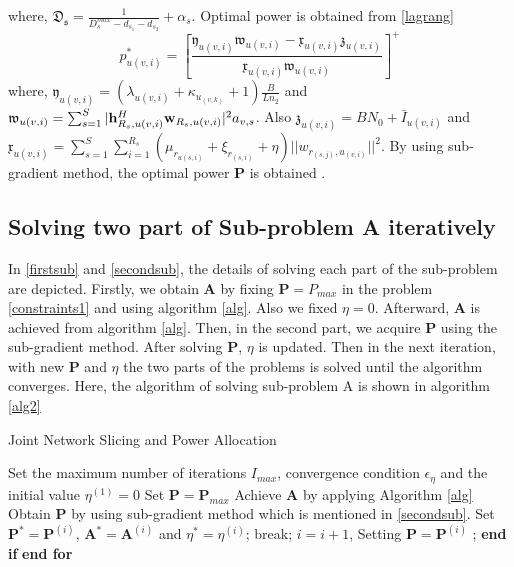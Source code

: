 \documentclass[conference]{IEEEtran}
\begin{document}
where, $\mathfrak{D_s}=\frac{1}{D_{s}^{max}-d_{s_1}-d_{s_2}}+\alpha_s$. Optimal power is obtained from  \eqref{lagrang}
\begin{equation}
p_{u(v,i)}^{*} = [\frac{\mathfrak{y}_{u(v,i)}\mathfrak{w}_{u(v,i)}-\mathfrak{x}_{u(v,i)}\mathfrak{z}_{u(v,i)}}{\mathfrak{x}_{u(v,i)}\mathfrak{w}_{u(v,i)} }]^+
\end{equation}
where, $\mathfrak{y}_{u(v,i)}= (\lambda_{u(v,i)}+\kappa_{u_{(v,k)}}+1)\frac{B}{Ln_2}$ and
$\mathfrak{w}_{u(v,i)} = \sum_{s=1}^{S}|\bold{h}_{R_s,u(v,i)}^H \bold{w}_{R_s,u(v,i)}|^2 a_{v,s}$. Also
$\mathfrak{z}_{u(v,i)} = BN_0 + \bar{I}_{u(v,i)}$ and $\mathfrak{x}_{u(v,i)} = \sum\limits_{s=1}^{S} \sum\limits_{i=1}^{R_s} ( \mu_{r_{u(s,i)}} + \xi_{r_{(s,i)}}+\eta)||w_{r_{(s,j)},u_{(v,i)}}||^2$.
By using sub-gradient method, the optimal power $\boldsymbol{P}$ is obtained \cite{mimoCran}.
\subsection{Solving two part of Sub-problem A iteratively}
In \eqref{firstsub} and \eqref{secondsub}, the details of solving each part of the sub-problem are depicted.
Firstly, we obtain $\boldsymbol{A}$ by fixing $\boldsymbol{P} = P_{max}$ in the problem \eqref{constraints1} and using algorithm \eqref{alg}. Also we fixed $\eta = 0$. Afterward, $\boldsymbol{A}$ is achieved from algorithm \ref{alg}. Then, in the second part, we acquire $\boldsymbol{P}$ using the sub-gradient method. After solving $\boldsymbol{P}$, $\eta$ is updated. Then in the next iteration, with new $\boldsymbol{P}$
and $\eta$ the two parts of the problems is solved until the algorithm converges.
Here, the algorithm of solving sub-problem A is shown in algorithm \eqref{alg2}
\begin{algorithm}
\caption{Joint Network Slicing and Power Allocation}\label{alg2}
\begin{algorithmic}[1]
\State Set the maximum number of iterations $I_{max}$, convergence condition $\epsilon_{\eta}$  and the initial value $\eta^{(1)} = 0$
\State Set $\boldsymbol{P} = \boldsymbol{P}_{max}$
\State Achieve $\boldsymbol{A}$ by applying Algorithm \eqref{alg}
\State Obtain $\boldsymbol{P}$ by using sub-gradient method which is mentioned in \eqref{secondsub}.
\State Set $\boldsymbol{P}^*= \boldsymbol{P}^{(i)} $, $\boldsymbol{A}^*= \boldsymbol{A}^{(i)} $   and  $ \eta^{*} =\eta^{(i)} $;
\State break;
\Else
\State $i= i+1$, Setting $\boldsymbol{P} = \boldsymbol{P}^{(i)}$ ;
\EndIf
\State \textbf{end if}
\EndFor
\State \textbf{end for}
\end{algorithmic}
\end{algorithm}
\end{document}
